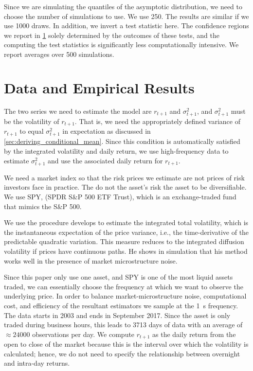 \documentclass[11pt, letterpaper, twoside, final]{article}
\begin{document}
Since we are simulating the quantiles of the asymptotic distribution, we need to choose the number of simulations to use. We use \num{250}. The results are similar if we use \num{1000} draws. In addition, we invert a test statistic here. The confidence regions we report in \cref{sec:empirics} solely determined by the outcomes of these tests, and the computing the test statistics is significantly less computationally intensive.
We report averages over \num{500} simulations.



\section{Data and Empirical Results}\label{sec:empirics}


The two series we need to estimate the model are $r_{t+1}$ and $\sigma^2_{t+1}$, and $\sigma^2_{t+1}$ must be the volatility of $r_{t+1}$.  That is, we need the appropriately defined variance of $r_{t+1}$ to equal $\sigma^2_{t+1}$ in expectation as discussed in \cref{sec:deriving_conditional_mean}.  Since this condition is automatically satisfied by the integrated volatility and daily return, we use high-frequency data to estimate $\sigma^2_{t+1}$ and use the associated daily return for $r_{t+1}$.  

We need a market index so that the risk prices we estimate are not prices of risk investors face in practice. The do not the asset's risk the asset to be diversifiable. We use SPY, (SPDR S\&P 500 ETF Trust), which is an exchange-traded fund that mimics the S\&P 500.  

We use the procedure \textcite{sangrey2018jumps} develops to estimate the integrated total volatility, which is the instantaneous expectation of the price variance, i.e., the time-derivative of the predictable quadratic variation. This measure reduces to the integrated diffusion volatility if prices have continuous paths. He shows in simulation that his method works well in the presence of market microstructure noise.

Since this paper only use one asset, and SPY is one of the most liquid assets traded, we can essentially choose the frequency at which we want to observe the underlying price. In order to balance market-microstructure noise, computational cost, and efficiency of the resultant estimators we sample at the \SI{1}{\second} frequency. The data starts in 2003 and ends in September 2017. Since the asset is only traded during business hours, this leads to \num{3713} days of data with an average of $\approx \num{24000}$ observations per day.  We compute $r_{t+1}$ as the daily return from the open to close of the market because this is the interval over which the volatility is calculated; hence, we do not need to specify the relationship between overnight and intra-day returns.  
\end{document}

